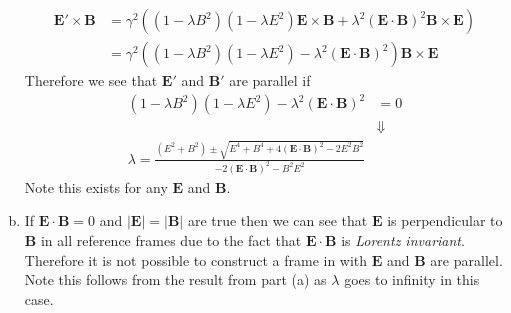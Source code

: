 \documentclass[11pt]{article}
\numberwithin{equation}{section}
\begin{document}
\begin{enumerate}[(a)]
\begin{align*}
        \mathbf{E}'\times\mathbf{B} &= \gamma^2\left((1-\lambda{B^2})(1-\lambda{E^2})\mathbf{E}\times\mathbf{B} + \lambda^2(\mathbf{E}\cdot\mathbf{B})^2\mathbf{B}\times\mathbf{E}\right)\\
        &= \gamma^2\left((1-\lambda{B^2})(1-\lambda{E^2}) - \lambda^2(\mathbf{E}\cdot\mathbf{B})^2\right)\mathbf{B}\times\mathbf{E}
    \end{align*}
    Therefore we see that $\mathbf{E}'$ and $\mathbf{B}'$ are parallel if
    \begin{align*}
        (1-\lambda{B^2})(1-\lambda{E^2}) - \lambda^2(\mathbf{E}\cdot\mathbf{B})^2 &= 0\\
                                     &\Downarrow\\
        \lambda = \frac{(E^2+B^2) \pm \sqrt{E^4+B^4+4(\mathbf{E}\cdot\mathbf{B})^2 - 2E^2B^2}}{-2(\mathbf{E}\cdot\mathbf{B})^2-B^2E^2}
    \end{align*}
    Note this exists for any $\mathbf{E}$ and $\mathbf{B}$.

\item
    If $\mathbf{E}\cdot\mathbf{B}=0$ and $|\mathbf{E}|=|\mathbf{B}|$ are true then we can see that $\mathbf{E}$ is 
    perpendicular to $\mathbf{B}$ in all 
    reference frames due to the fact that $\mathbf{E}\cdot\mathbf{B}$ is \emph{Lorentz invariant}. 
    Therefore it is not possible to construct a frame in with $\mathbf{E}$ and $\mathbf{B}$ are parallel. 
    Note this follows from the result from part (a) as $\lambda$ goes to infinity in this case.


\end{enumerate}
\end{document}
